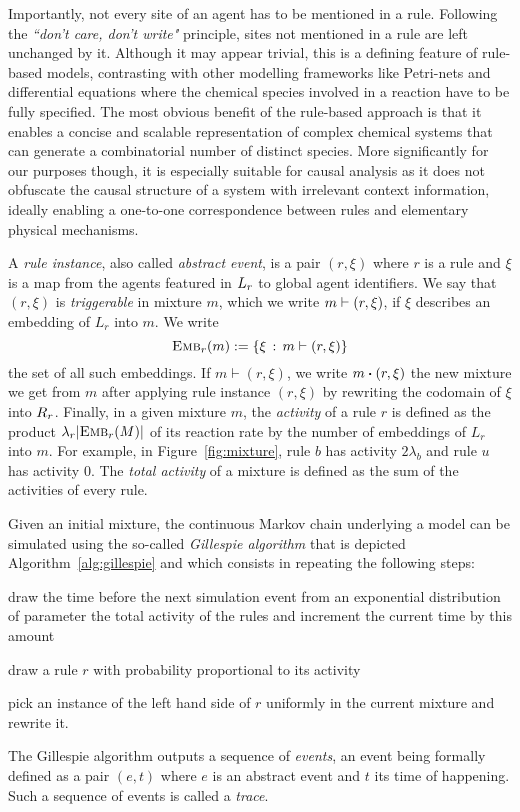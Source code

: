 

Importantly, not every site of an agent has to be mentioned in a rule.
Following the \textit{``don't care, don't write"} principle, sites not
mentioned in a rule are left unchanged by it. Although it may appear
trivial, this is a defining feature of rule-based models, contrasting
with other modelling frameworks %
like Petri-nets and differential equations where the chemical species
involved in a reaction have to be fully specified. The most obvious
benefit of the rule-based approach is that it enables a concise and
scalable representation of complex chemical systems that can generate
a combinatorial number of distinct species. More significantly for our
purposes though, it is especially suitable for causal analysis as it
does not obfuscate the causal structure of a system with irrelevant
context information, ideally enabling a one-to-one correspondence
between rules and elementary physical mechanisms.

A \emph{rule instance}, also called \emph{abstract event}, is a pair
$(r, \xi)$ where $r$ is a rule and $\xi$ is a map from the agents
featured in $L_{r}$ to global agent identifiers.  We say that
$(r, \xi)$ is \emph{triggerable} in mixture $m$, which we write
$m \vdash (r, \xi)$, if $\xi$ describes an embedding of $L_r$
into $m$.  We write
\[{\textsc{Emb}}_{r}(m) := \{ \xi \,:\, m \vdash (r, \xi)\}\] the
set of all such embeddings. If $m \vdash (r, \xi)$, we write
$\UPDATE{m}{(r, \xi)}$ the new mixture we get from $m$ after applying
rule instance $(r, \xi)$ by rewriting the codomain of $\xi$ into
$R_{r}$.  Finally, in a given mixture $m$, the \emph{activity} of a
rule $r$ is defined as the product $\lambda_r|{\textsc{Emb}}_{r}(M)|$ of its
reaction rate by the number of embeddings of $L_r$ into $m$. For
example, in Figure~\ref{fig:mixture}, rule $b$ has activity
$2\lambda_b$ and rule $u$ has activity $0$. The \emph{total activity}
of a mixture is defined as the sum of the activities of every rule.

Given an initial mixture, the continuous Markov chain underlying a
model can be simulated using the so-called \emph{Gillespie algorithm}
\cite{DanosEtAl-APLAS07} that is depicted
Algorithm~\ref{alg:gillespie} and which consists in repeating the
following steps:
\begin{inparaenum}[1)]
\item draw the time before the next simulation event from an
  exponential distribution of parameter the total activity of the
  rules and increment the current time by this amount
\item draw a rule $r$ with probability proportional to its activity
\item pick an instance of the left hand side of $r$ uniformly in the
  current mixture and rewrite it.
\end{inparaenum}
The Gillespie algorithm outputs a sequence of \emph{events}, an event
being formally defined as a pair $(e, t)$ where $e$ is an abstract
event and $t$ its time of happening. Such a sequence of events is
called a \emph{trace}.

